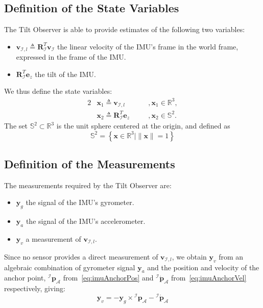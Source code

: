 \documentclass{IJCAS}
\begin{document}
\subsection{Definition of the State Variables}
The Tilt Observer is able to provide estimates of the following two variables: 
\begin{itemize}
    \item $\boldsymbol{v}_{\mathcal{I}, l} \triangleq \boldsymbol{R}^{T}_{\mathcal{I}} \boldsymbol{v}_{\mathcal{I}} $ the linear velocity of the IMU's frame in the world frame, expressed in the frame of the IMU.
    \item $\boldsymbol{R}^{T}_{\mathcal{I}} \boldsymbol{e}_z$ the tilt of the IMU.
\end{itemize}
We thus define the state variables: 
\begin{alignat}{2}
&\boldsymbol{x}_{1} \triangleq \boldsymbol{v}_{\mathcal{I}, l} \quad &&, \boldsymbol{x}_{1} \in \mathbb{R}^{3}, \label{eq:x1} \\
&\boldsymbol{x}_{2} \triangleq \boldsymbol{R}^{T}_{\mathcal{I}} \boldsymbol{e}_z \quad &&, \boldsymbol{x}_{2} \in \mathbb{S}^{2}. \label{eq:x2}
\end{alignat} 
The set $\mathbb{S}^{2} \subset \mathbb{R}^{3}$ is the unit sphere centered at the origin, and defined as
\begin{equation}
    \mathbb{S}^{2} = \left\{ \boldsymbol{x} \in \mathbb{R}^{3} \vert \lVert \boldsymbol{x} \rVert=1 \right\}
\end{equation}


\subsection{Definition of the Measurements} \label{subsec:tiltMeas}
The measurements required by the Tilt Observer are:
\begin{itemize}
    \item $\boldsymbol{y}_{g}$ the signal of the IMU's gyrometer.
    \item $\boldsymbol{y}_{a}$ the signal of the IMU's accelerometer.
    \item $\boldsymbol{y}_{v}$ a measurement of $\boldsymbol{v}_{\mathcal{I}, l}$.
\end{itemize}
Since no sensor provides a direct measurement of $\boldsymbol{v}_{\mathcal{I}, l}$, we obtain $\boldsymbol{y}_{v}$ from an algebraic combination of gyrometer signal $\boldsymbol{y}_{a}$ and the position and velocity of the anchor point, ${^{\mathcal{I}}}\boldsymbol{p}_{\mathcal{A}}$  from~\eqref{eq:imuAnchorPos}
and ${^{\mathcal{I}}} \dot{\boldsymbol{p}}_{\mathcal{A}}$ from~\eqref{eq:imuAnchorVel} respectively, giving:
\begin{equation}
    \boldsymbol{y}_v = - \boldsymbol{y}_{g} \times {^{\mathcal{I}}}\boldsymbol{p}_{\mathcal{A}} - {^{\mathcal{I}}} \dot{\boldsymbol{p}}_{\mathcal{A}} \label{eq:yv}
\end{equation}
\end{document}
